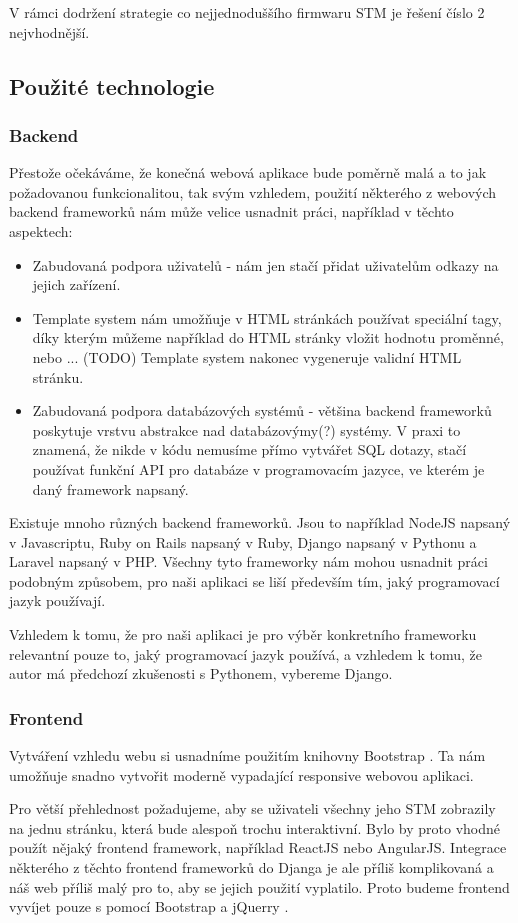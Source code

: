 V rámci dodržení strategie co nejjednoduššího firmwaru STM je řešení číslo 2 nejvhodnější.

\subsection{Použité technologie}

\subsubsection{Backend}
Přestože očekáváme, že konečná webová aplikace bude poměrně malá a to jak požadovanou funkcionalitou, tak svým
vzhledem, použití některého z webových backend frameworků nám může velice usnadnit práci, například v těchto
aspektech:
\begin{itemize}
    \item Zabudovaná podpora uživatelů - nám jen stačí přidat uživatelům odkazy na jejich
        zařízení.
    \item Template system nám umožňuje v HTML stránkách používat speciální
        tagy, díky kterým můžeme například do HTML stránky vložit hodnotu proměnné, nebo ... (TODO)
        Template system nakonec vygeneruje validní HTML stránku.
    \item Zabudovaná podpora databázových systémů - většina backend frameworků poskytuje vrstvu abstrakce nad
        databázovýmy(?) systémy. V praxi to znamená, že nikde v kódu nemusíme přímo vytvářet SQL dotazy,
        stačí používat funkční API pro databáze v programovacím jazyce, ve kterém je daný framework napsaný.
\end{itemize}

Existuje mnoho různých backend frameworků.
Jsou to například NodeJS napsaný v Javascriptu, Ruby on Rails napsaný v Ruby, Django \cite{Django} napsaný v Pythonu a
Laravel napsaný v PHP.
Všechny tyto frameworky nám mohou usnadnit práci podobným způsobem, pro naši aplikaci se liší především
tím, jaký programovací jazyk používají.

Vzhledem k tomu, že pro naši aplikaci je pro výběr konkretního frameworku relevantní pouze to, jaký programovací
jazyk používá, a vzhledem k tomu, že autor má předchozí zkušenosti s Pythonem, vybereme Django.

\subsubsection{Frontend}
Vytváření vzhledu webu si usnadníme použitím knihovny Bootstrap \cite{Bootstrap}.
Ta nám umožňuje snadno vytvořit moderně vypadající responsive webovou aplikaci. %

Pro větší přehlednost požadujeme, aby se uživateli všechny jeho STM zobrazily na jednu stránku,
která bude alespoň trochu interaktivní.
Bylo by proto vhodné použít nějaký frontend framework, například ReactJS nebo AngularJS.
Integrace některého z těchto frontend frameworků do Djanga je ale příliš komplikovaná a náš web
příliš malý pro to, aby se jejich použití vyplatilo.
Proto budeme frontend vyvíjet pouze s pomocí Bootstrap a jQuerry \cite{jQuery}.
